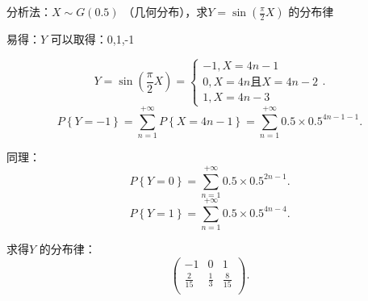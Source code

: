 \begin{eg}
	分析法：$X\sim G\left( 0.5 \right) $ （几何分布），求$Y=\sin\left( \displaystyle{\frac{\pi}{2}}X \right) $ 的分布律

	易得：$Y$ 可以取得：0,1,-1

	\[
		Y=\sin\left( \frac{\pi}{2}X \right) =\begin{cases}
			-1, X=4n-1\\
			0,X=4n\text{且}X=4n-2\\
			1,X=4n-3
		\end{cases}
	.\] 
	\[
		P\left\{ Y=-1 \right\} =\sum_{n=1}^{+\infty} P\left\{ X=4n-1 \right\} =\sum_{n=1}^{+\infty} 0.5\times 0.5^{4n-1-1}
	.\] 

	同理：
	\[
		P\left\{ Y=0 \right\} =\sum_{n=1}^{+\infty} 0.5\times 0.5^{2n-1}
	.\] 
	\[
		P\left\{ Y=1 \right\} =\sum_{n=1}^{+\infty} 0.5\times 0.5^{4n-4}
	.\] 

	求得$Y$ 的分布律：
	\[
		\begin{pmatrix}
			-1 & 0 & 1\\
			\displaystyle{\frac{2}{15}} & \displaystyle{\frac{1}{3}} & \displaystyle{\frac{8}{15}}\\
		\end{pmatrix}
	.\] 
\end{eg}

